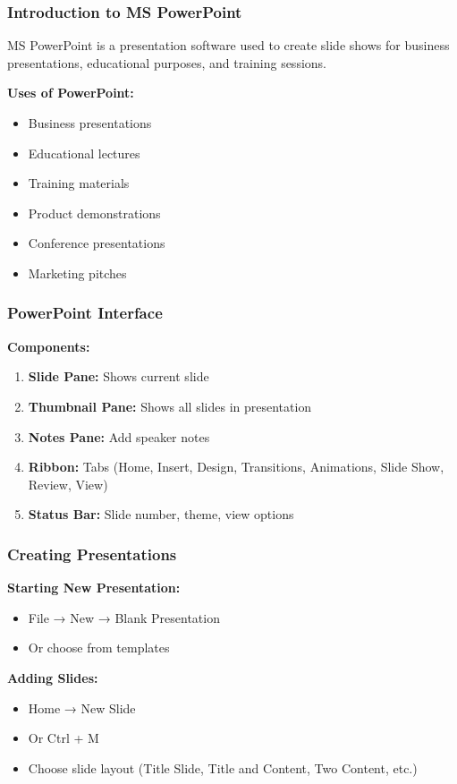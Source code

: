 \documentclass[12pt,a4paper]{article}
\begin{document}
\subsubsection{Introduction to MS PowerPoint}
MS PowerPoint is a presentation software used to create slide shows for business presentations, educational purposes, and training sessions.

\textbf{Uses of PowerPoint:}
\begin{itemize}
    \item Business presentations
    \item Educational lectures
    \item Training materials
    \item Product demonstrations
    \item Conference presentations
    \item Marketing pitches
\end{itemize}

\subsubsection{PowerPoint Interface}

\textbf{Components:}
\begin{enumerate}
    \item \textbf{Slide Pane:} Shows current slide
    \item \textbf{Thumbnail Pane:} Shows all slides in presentation
    \item \textbf{Notes Pane:} Add speaker notes
    \item \textbf{Ribbon:} Tabs (Home, Insert, Design, Transitions, Animations, Slide Show, Review, View)
    \item \textbf{Status Bar:} Slide number, theme, view options
\end{enumerate}

\subsubsection{Creating Presentations}

\textbf{Starting New Presentation:}
\begin{itemize}
    \item File → New → Blank Presentation
    \item Or choose from templates
\end{itemize}

\textbf{Adding Slides:}
\begin{itemize}
    \item Home → New Slide
    \item Or Ctrl + M
    \item Choose slide layout (Title Slide, Title and Content, Two Content, etc.)
\end{itemize}
\end{document}
